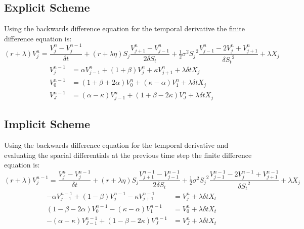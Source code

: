\documentclass[a4paper,11pt,oneside]{report}
\theoremstyle{plain}
\theoremstyle{definition}
\def\DS{\ensuremath{\delta S_t}\xspace}
\def\Dt{\ensuremath{\delta t}\xspace}
\def\Vjn{\ensuremath{V^{n}_j}\xspace}
\def\Vjnm{\ensuremath{V^{n - 1}_j}\xspace}
\def\Vjmn{\ensuremath{V^{n}_{j - 1}}\xspace}
\def\Vjpn{\ensuremath{V^{n}_{j + 1}}\xspace}
\def\Vjmnm{\ensuremath{V^{n - 1}_{j - 1}}\xspace}
\def\Vjpnm{\ensuremath{V^{n - 1}_{j + 1}}\xspace}
\def\Von{\ensuremath{V^{n}_{0}\xspace}}
\def\Vopn{\ensuremath{V^{n}_{1}\xspace}}
\def\VJn{\ensuremath{V^{n}_{J}\xspace}}
\def\Vonm{\ensuremath{V^{n - 1}_{0}\xspace}}
\def\Vopnm{\ensuremath{V^{n - 1}_{1}\xspace}}
\def\VJnm{\ensuremath{V^{n - 1}_{J}\xspace}}
\def\VJmnm{\ensuremath{V^{n - 1}_{J - 1}\xspace}}
\def\Sj{\ensuremath{S_j}\xspace}
\def\Xj{\ensuremath{X_j}\xspace}
\def\X{\ensuremath{X_t}\xspace}
\def\half{\tfrac{1}{2}}
\begin{document}
\subsection{Explicit Scheme}
Using the backwards difference equation for the temporal derivative the finite difference equation is:
\begin{displaymath}
 (r + \lambda)\Vjn = \frac{\Vjn - \Vjnm}{\Dt} + (r + \lambda\eta)\Sj\frac{\Vjpn - \Vjmn}{2\DS} + \half\sigma^2\Sj^2\frac{\Vjmn - 2\Vjn + \Vjpn}{\DS^2} + \lambda\Xj
\end{displaymath}
\begin{align}
 \Vjnm &= \alpha\Vjmn + (1 + \beta)\Vjn + \kappa\Vjpn + \lambda\Dt\Xj \\
 \Vonm &= (1 + \beta + 2\alpha)\Von + (\kappa - \alpha)\Vopn + \lambda\Dt\Xj \\
 \VJnm &= (\alpha - \kappa)\Vjmn + (1 + \beta - 2\kappa)\VJn + \lambda\Dt\Xj
\end{align}


\subsection{Implicit Scheme}
Using the backwards difference equation for the temporal derivative and evaluating the spacial differentials at the previous time step the finite difference equation is:
\small\begin{displaymath}
 (r + \lambda)\Vjnm = \frac{\Vjn - \Vjnm}{\Dt} + (r + \lambda\eta)\Sj\frac{\Vjpnm - \Vjmnm}{2\DS} + \half\sigma^2\Sj^2\frac{\Vjmnm - 2\Vjnm + \Vjpnm}{\DS^2} + \lambda\Xj
\end{displaymath}\normalsize
\begin{align}
 -\alpha\Vjmnm + (1 - \beta)\Vjnm - \kappa\Vjpnm &= \Vjn + \lambda\Dt\X \\
 (1 - \beta - 2\alpha)\Vonm - (\kappa - \alpha)\Vopnm &= \Von + \lambda\Dt\X \\
 -(\alpha - \kappa)\VJmnm + (1 - \beta - 2\kappa)\VJnm &= \VJn + \lambda\Dt\X
\end{align}

\end{document}
